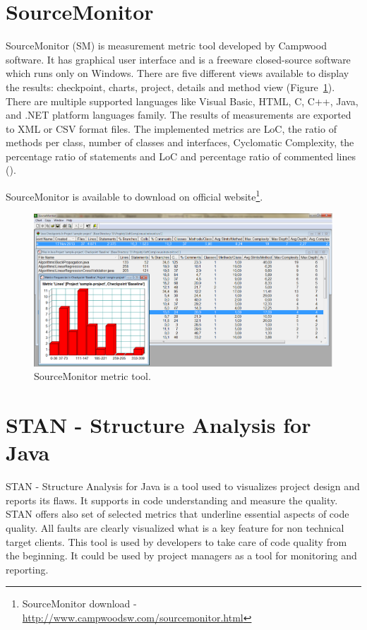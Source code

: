 \section{SourceMonitor}
SourceMonitor (SM) is measurement metric tool developed by Campwood software. It has graphical user interface and is a freeware closed-source software which runs only on Windows. There are five different views available to display the results: checkpoint, charts, project, details and method view (Figure~\ref{fig:sourcemonitor}). There are multiple supported languages like Visual Basic, HTML, C, C++, Java, and .NET platform languages family. The results of measurements are exported to XML or CSV format files. The implemented metrics are \ac{LoC}, the ratio of methods per class, number of classes and interfaces, Cyclomatic Complexity, the percentage ratio of statements and \ac{LoC} and percentage ratio of commented lines (\cite{indie}).

SourceMonitor is available to download on official website\footnote{SourceMonitor download - \url{http://www.campwoodsw.com/sourcemonitor.html}}.

\begin{figure}[h!]
	\centering
	\includegraphics[scale=0.4]{img/sourcemonitor.png} 
	\caption{SourceMonitor metric tool.}		
	\label{fig:sourcemonitor}
\end{figure}

\section{STAN - Structure Analysis for Java} 
STAN - Structure Analysis for Java is a tool used to visualizes project design and reports its flaws. It supports in code understanding and measure the quality. STAN offers also set of selected metrics that underline essential aspects of code quality. All faults are clearly visualized what is a key feature for non technical target clients. This tool is used by developers to take care of code quality from the beginning. It could be used by project managers as a tool for monitoring and reporting. 

